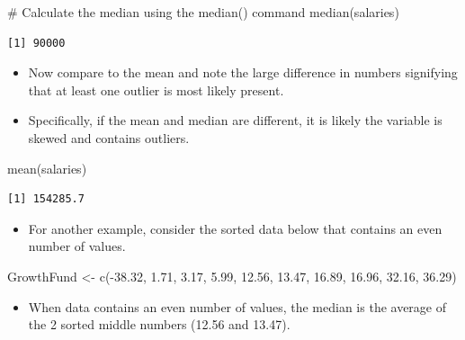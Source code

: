 \documentclass[
  letterpaper,
  DIV=11,
  numbers=noendperiod]{scrreprt}
\newenvironment{Shaded}{\begin{snugshade}}{\end{snugshade}}
\newcommand{\CommentTok}[1]{\textcolor[rgb]{0.37,0.37,0.37}{#1}}
\newcommand{\FloatTok}[1]{\textcolor[rgb]{0.68,0.00,0.00}{#1}}
\newcommand{\FunctionTok}[1]{\textcolor[rgb]{0.28,0.35,0.67}{#1}}
\newcommand{\NormalTok}[1]{\textcolor[rgb]{0.00,0.23,0.31}{#1}}
\newcommand{\OtherTok}[1]{\textcolor[rgb]{0.00,0.23,0.31}{#1}}
\newcommand{\SpecialCharTok}[1]{\textcolor[rgb]{0.37,0.37,0.37}{#1}}
\providecommand{\tightlist}{%
  \setlength{\itemsep}{0pt}\setlength{\parskip}{0pt}}\usepackage{longtable,booktabs,array}
\begin{document}
\begin{Shaded}
\begin{Highlighting}[]
\CommentTok{\# Calculate the median using the median() command}
\FunctionTok{median}\NormalTok{(salaries)}
\end{Highlighting}
\end{Shaded}

\begin{verbatim}
[1] 90000
\end{verbatim}

\begin{itemize}
\tightlist
\item
  Now compare to the mean and note the large difference in numbers
  signifying that at least one outlier is most likely present.
\item
  Specifically, if the mean and median are different, it is likely the
  variable is skewed and contains outliers.
\end{itemize}

\begin{Shaded}
\begin{Highlighting}[]
\FunctionTok{mean}\NormalTok{(salaries)}
\end{Highlighting}
\end{Shaded}

\begin{verbatim}
[1] 154285.7
\end{verbatim}

\begin{itemize}
\tightlist
\item
  For another example, consider the sorted data below that contains an
  even number of values.
\end{itemize}

\begin{Shaded}
\begin{Highlighting}[]
\NormalTok{GrowthFund }\OtherTok{\textless{}{-}} \FunctionTok{c}\NormalTok{(}\SpecialCharTok{{-}}\FloatTok{38.32}\NormalTok{, }\FloatTok{1.71}\NormalTok{, }\FloatTok{3.17}\NormalTok{, }\FloatTok{5.99}\NormalTok{, }\FloatTok{12.56}\NormalTok{, }\FloatTok{13.47}\NormalTok{, }\FloatTok{16.89}\NormalTok{, }\FloatTok{16.96}\NormalTok{, }\FloatTok{32.16}\NormalTok{,}
    \FloatTok{36.29}\NormalTok{)}
\end{Highlighting}
\end{Shaded}

\begin{itemize}
\tightlist
\item
  When data contains an even number of values, the median is the average
  of the 2 sorted middle numbers (12.56 and 13.47).
\end{itemize}
\end{document}
